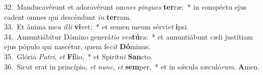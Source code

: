 {32.~}Manducavérunt et adoravérunt om\textit{nes} \textit{pin}\textit{gues} \textbf{ter}ræ:~* in conspéctu ejus cadent omnes qui descéndunt \textit{in} \textbf{ter}ram.\\
{33.~}Et ánima me\textit{a} \textit{il}\textit{li} \textbf{vi}vet:~* et semen meum sérvi\textit{et} \textbf{i}psi.\\
{34.~}Annuntiábitur Dómino generá\textit{ti}\textit{o} \textit{ven}\textbf{tú}ra:~* et annuntiábunt cæli justítiam ejus pópulo qui nascétur, quem fe\textit{cit} \textbf{Dó}minus.\\
{35.~}Glória \textit{Pa}\textit{tri}, \textit{et} \textbf{Fí}lio,~* et Spirítu\textit{i} \textbf{San}cto.\\
{36.~}Sicut erat in princípio, \textit{et} \textit{nunc}, \textit{et} \textbf{sem}per,~* et in sǽcula sæculó\textit{rum}. \textbf{A}men.\\
